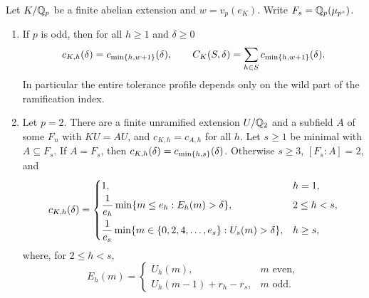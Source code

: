 \begin{theorem}\label{cost:thm:abelian}
Let $K/\mathbb{Q}_p$ be a finite abelian extension and $w=v_p(e_K)$. Write
$F_s=\mathbb{Q}_p(\mu_{p^s})$.
\begin{enumerate}[label=\textup{(\alph*)}]
\item If $p$ is odd, then for all $h\ge1$ and $\delta\ge0$
\[
 c_{K,h}(\delta)=c_{\min\{h,w+1\}}(\delta),\qquad
 C_K(S,\delta)=\sum_{h\in S}c_{\min\{h,w+1\}}(\delta).
\]
In particular the entire tolerance profile depends only on the wild part of the
ramification index.
\item Let $p=2$. There are a finite unramified extension $U/\mathbb{Q}_2$ and a subfield $A$ of
some $F_n$ with $KU=AU$, and $c_{K,h}=c_{A,h}$ for all $h$. Let $s\ge1$ be minimal with
$A\subseteq F_s$. If $A=F_s$, then $c_{K,h}(\delta)=c_{\min\{h,s\}}(\delta)$. Otherwise
$s\ge3$, $[F_s:A]=2$, and
\[
 c_{K,h}(\delta)=
 \begin{cases}
 1,& h=1,\\[2pt]
 \dfrac1{e_h}\min\{m\le e_h:E_h(m)>\delta\},&2\le h<s,\\[8pt]
 \dfrac1{e_s}\min\{m\in\{0,2,4,\ldots,e_s\}:U_s(m)>\delta\},&h\ge s,
 \end{cases}
\]
where, for $2\le h<s$,
\[
 E_h(m)=\begin{cases}U_h(m),&m\text{ even},\\ U_h(m-1)+r_h-r_s,&m\text{ odd}.\end{cases}
\]
\end{enumerate}
\end{theorem}

